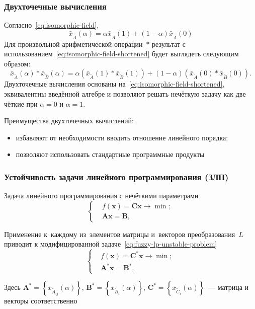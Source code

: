 \documentclass[12pt]{beamer}
\begin{document}
\begin{frame}
  \frametitle{Двухточечные вычисления}
  Согласно~\eqref{eq:isomorphic-field},
  \begin{equation}
    \label{eq:isomorphic-field-shortened}
    \bar{x}_{\tilde A}\left( \alpha \right)=\alpha \bar{x}_{\tilde A}\left( 1 \right)+\left( 1-\alpha  \right) \bar{x}_{\tilde A}\left( 0 \right)
  \end{equation}
  Для произвольной арифметической операции~$*$ результат с использованием~\eqref{eq:isomorphic-field-shortened} будет выглядеть следующим образом:
  \begin{equation}
  \label{eq:two-point-calculations}
    \bar{x}_{\tilde A}\left( \alpha \right)*\bar{x}_{\tilde B}\left(\alpha \right)=\alpha \left(\bar{x}_{\tilde A}\left( 1 \right)*\bar{x}_{\tilde B}\left(1 \right) \right)+\left(1-\alpha \right)\left(\bar{x}_{\tilde A}\left(0 \right)*\bar{x}_{\tilde B}\left(0 \right) \right).
  \end{equation}
  Двухточечные вычисления основаны на~\eqref{eq:isomorphic-field-shortened}, эквивалентны введённой алгебре и позволяют решать нечёткую задачу как две чёткие при $\alpha=0$ и $\alpha=1$. 
  
  Преимущества двухточечных вычислений:
  \begin{itemize}
    \item избавляют от необходимости вводить отношение линейного порядка;
    \item позволяют использовать стандартные программные продукты
  \end{itemize}
\end{frame}

\begin{frame}
  \frametitle{Устойчивость задачи линейного программирования (ЗЛП)}
  Задача линейного программирования с нечёткими параметрами
  \begin{equation}
    \left\{ \begin{aligned}
      & f\left( \mathbf{x} \right)=\mathbf{Cx}\to \min;  \\ 
      & \mathbf{Ax}=\mathbf{B},
    \end{aligned} \right.
  \end{equation}

  Применение к~каждому из~элементов матрицы и~векторов преобразования~$L$ приводит к модифицированной задаче~\eqref{eq:fuzzy-lp-unstable-problem}
  \begin{equation}
  \label{eq:fuzzy-lp-unstable-problem}
    \left\{ \begin{aligned}
      & f\left( \mathbf{x} \right)={\mathbf{C}^{*}}\mathbf{x}\to \min;  \\ 
      & {\mathbf{A}^{*}}\mathbf{x}={\mathbf{B}}^{*},
    \end{aligned} \right.
  \end{equation}
  
  Здесь $\mathbf{A}^{*}=\left\{ \bar{x}_{\tilde{A}_{ij}}\left(\alpha \right) \right\}$, $\mathbf{B}^{*}=\left\{ \bar{x}_{\tilde{B}_i}\left(\alpha \right) \right\}$, $\mathbf{C}^{*}=\left\{ \bar{x}_{\tilde{C}_i}\left(\alpha \right) \right\}$~--- матрица и векторы соответственно
\end{frame}
\end{document}

